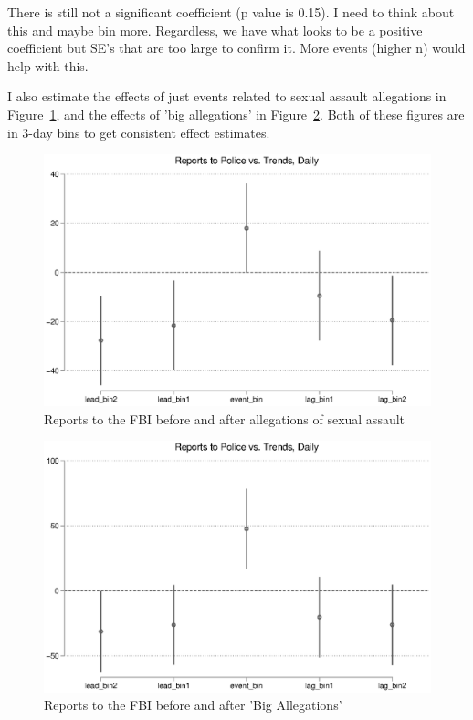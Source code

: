 \documentclass[AER,draftmode]{AEA}
\begin{document}
There is still not a significant coefficient (p value is 0.15). I need to think about this and maybe bin more. Regardless, we have what looks to be a positive coefficient but SE's that are too large to confirm it. More events (higher n) would help with this.

I also estimate the effects of just events related to sexual assault allegations in Figure~\ref{figure:events_police_binned_alle}, and the effects of 'big allegations' in Figure~\ref{figure:events_police_binned_big}. Both of these figures are in 3-day bins to get consistent effect estimates.

\begin{figure}
\includegraphics[width=\linewidth]{figures/events_police_binned_alle.eps}
\caption{Reports to the FBI before and after allegations of sexual assault}\label{figure:events_police_binned_alle}
\end{figure}

\begin{figure}
\includegraphics[width=\linewidth]{figures/events_police_binned_big.eps}
\caption{Reports to the FBI before and after 'Big Allegations'}\label{figure:events_police_binned_big}
\end{figure}
\end{document}
